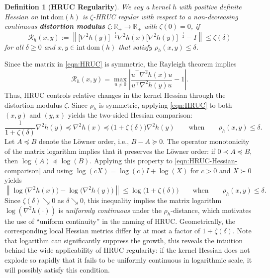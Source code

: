 \documentclass{article}
\theoremstyle{plain}
\newtheorem{proposition}[theorem]{Proposition}
\newtheorem{definition}[theorem]{Definition}
\theoremstyle{definition}
\theoremstyle{remark}
\newcommand{\cR}{\mathcal{R}}
\newcommand{\idom}[1]{\mathrm{int\ dom}(#1)}
\begin{document}
\begin{definition}[\textbf{HRUC Regularity}]
\label{def:kernel cond}
We say a kernel $h$ with positive definite Hessian on $\idom{h}$ is $\zeta$-HRUC regular with respect to a non-decreasing continuous \textbf{distortion modulus} $\zeta\!:\mathbb{R}_+\!\to\!\mathbb{R}_+$ with $\zeta(0)=0$, if 
\begin{equation}
    \label{eqn:HRUC}
  \cR_h(x,y):=  \left\|\big[\nabla^2 h(y)\big]^{-\frac12}\nabla^2 h(x)\big[\nabla^2 h(y)\big]^{-\frac12}-I\right\| \leq \zeta(\delta)
\end{equation}
for all $\delta\geq0$ and $x,y\in\idom{h}$ that satisfy $\rho_h(x,y)\leq \delta$.  
\end{definition}
Since the matrix in \eqref{eqn:HRUC} is symmetric, the Rayleigh theorem \cite[Theorem~4.2.2]{HornJohnson2012} implies
\begin{equation*}
    \cR_h(x,y)
    =\max_{u\neq0}\left|\frac{u^\top\nabla^2h(x)u}{u^\top\nabla^2h(y)u}-1\right|.
\end{equation*}
Thus, HRUC controls relative changes in the kernel Hessian through the distortion modulus $\zeta$. Since $\rho_h$ is symmetric, applying \eqref{eqn:HRUC} to both $(x,y)$ and $(y,x)$ yields the two-sided Hessian comparison:
\begin{equation}
    \label{eqn:HRUC-Hessian-comparison}
    \frac{1}{1+\zeta(\delta)}\nabla^2h(y)\preceq \nabla^2h(x)\preceq \big(1+\zeta(\delta)\big)\nabla^2h(y)\qquad \text{when}\qquad \rho_h(x,y)\leq\delta.
\end{equation} 
Let $A\preceq B$ denote the L\"owner order, i.e., $B-A\succeq0$. The operator monotonicity of the matrix logarithm \cite[Theorem~V.4.7]{Bhatia1997} implies that it preserves the L\"owner order: if $0\prec A\preceq B$, then $\log(A)\preceq\log(B)$. Applying this property to \eqref{eqn:HRUC-Hessian-comparison} and using $\log(cX)=\log(c)I+\log(X)$ for $c>0$ and $X\succ0$ yields
\begin{equation*}
    \left\|\log\!\big(\nabla^2h(x)\big)-\log\!\big(\nabla^2h(y)\big)\right\|
    \leq \log\!\big(1+\zeta(\delta)\big)
    \qquad \text{when}\qquad \rho_h(x,y)\leq\delta.
\end{equation*}
Since $\zeta(\delta)\searrow 0$ as $\delta\searrow 0$, this inequality implies the matrix logarithm $\log \left(\nabla^2 h(\cdot)\right)$ is \emph{uniformly continuous} under the $\rho_h$-distance, which motivates the use of ``uniform continuity'' in the naming of HRUC.  
Geometrically, the corresponding local Hessian metrics differ by at most a factor of $1+\zeta(\delta)$. Note that logarithm can significantly suppress the growth, this reveals the intuition behind the wide applicability of HRUC regularity: if the kernel Hessian does not explode so rapidly that it fails to be uniformly continuous in logarithmic scale, it will possibly satisfy this condition. 
\end{document}

